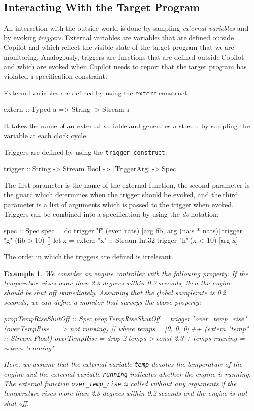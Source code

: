 \documentclass[]{article}
\theoremstyle{example}
\newtheorem{example}{Example}
\begin{document}
\subsection{Interacting With the Target Program}
\label{sec:interacting}
All interaction with the outside world is done by sampling \emph{external
variables} and by evoking \emph{triggers}.
External variables are variables that are defined outside Copilot and which
reflect the visible state of the target program that we are monitoring.
Analogously, triggers are functions that are defined outside Copilot and which
are evoked when Copilot needs to report that the target program has violated a
specification constraint.

External variables are defined by using the {\tt extern} construct:
%
\begin{code}
extern :: Typed a => String -> Stream a
\end{code}
%
It takes the name of an external variable and generates a stream by sampling
the variable at each clock cycle.

Triggers are defined by using the {\tt trigger construct}:
%
\begin{code}
trigger :: String -> Stream Bool -> [TriggerArg] -> Spec
\end{code}
%
The first parameter is the name of the external function, the second parameter is the
guard which determines when the trigger should be evoked, and the third parameter
is a list of arguments which is passed to the trigger when evoked.
Triggers can be combined into a specification by using the \emph{do}-notation:
%
\begin{code}
spec :: Spec
spec =
  do
    trigger "f" (even nats) [arg fib, arg (nats * nats)]
    trigger "g" (fib > 10) []
    let x = extern "x" :: Stream Int32
    trigger "h" (x < 10) [arg x]
\end{code}
%
The order in which the triggers are defined is irrelevant.

\begin{example}
\label{exm:engine}
We consider an engine controller with the following property:
If the temperature rises more than 2.3 degrees within 0.2 seconds, then
the engine should be shut off immediately.
Assuming that the global samplerate is 0.2 seconds, we can define a monitor that
surveys the above property:
%
\begin{code}
propTempRiseShutOff :: Spec
propTempRiseShutOff = trigger "over_temp_rise" (overTempRise ==> not running) []
  where
    temps        = [0, 0, 0] ++ (extern "temp" :: Stream Float)
    overTempRise = drop 2 temps > const 2.3 + temps
    running      = extern "running"

\end{code}
%
Here, we assume that the external variable {\tt temp} denotes the temperature of the
engine and the external variable {\tt running} indicates whether the engine is running.
The external function {\tt over\_temp\_rise} is called without any arguments if the
temperature rises more than 2.3 degrees within 0.2 seconds and the engine is not shut
off.
\end{example}
\end{document}
